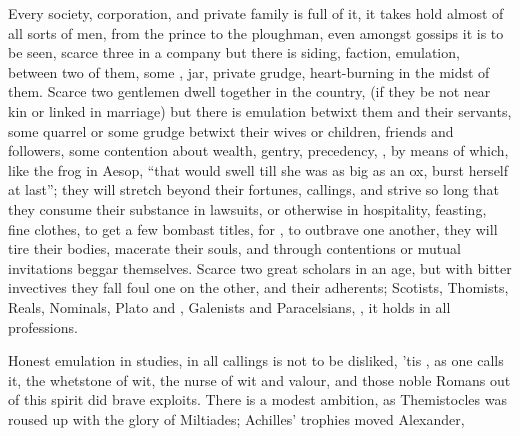 
Every society, corporation, and private family is full of it, it takes hold
almost of all sorts of men, from the prince to the ploughman, even amongst
gossips it is to be seen, scarce three in a company but there is siding,
faction, emulation, between two of them, some , jar, private
grudge, heart-burning in the midst of them. Scarce two gentlemen dwell together
in the country, (if they be not near kin or linked in marriage) but there is
emulation betwixt them and their servants, some quarrel or some grudge betwixt
their wives or children, friends and followers, some contention about wealth,
gentry, precedency, \etc{}, by means of which, like the frog in
Aesop, \enquote{that would swell till she was as big as an ox,
burst herself at last}; they will stretch beyond their fortunes, callings, and
strive so long that they consume their substance in lawsuits, or otherwise in
hospitality, feasting, fine clothes, to get a few bombast titles, for
, to outbrave one another, they will
tire their bodies, macerate their souls, and through contentions or mutual
invitations beggar themselves. Scarce two great scholars in an age, but with
bitter invectives they fall foul one on the other, and their adherents;
Scotists, Thomists, Reals, Nominals, Plato and \Aristotle{}, Galenists and
Paracelsians, \etc{}, it holds in all professions.

Honest emulation in studies, in all callings is not to be
disliked, 'tis , as one calls it, the whetstone of wit, the
nurse of wit and valour, and those noble Romans out of this spirit did brave
exploits. There is a modest ambition, as Themistocles was roused up with the
glory of Miltiades; Achilles' trophies moved Alexander,

